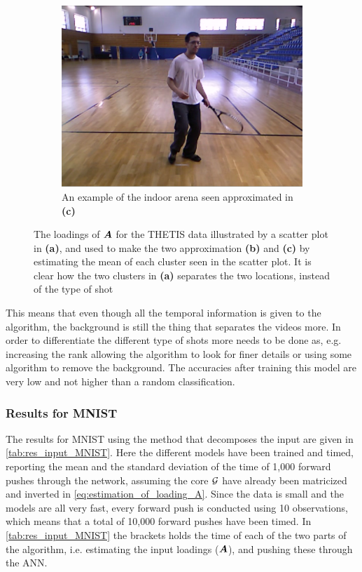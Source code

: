 \begin{figure}
\begin{subfigure}{.4\linewidth}
        \centering
        \captionsetup{width=.95\linewidth}
        \includegraphics[width=.78\linewidth]{Pics/06_results/loc_2_real.png}
        \caption{An example of the indoor arena seen approximated in \textbf{(c)}}
    \end{subfigure}
    \caption{The loadings of $\boldsymbol{A}$ for the THETIS data illustrated by a scatter plot in \textbf{(a)}, and used to make the two approximation \textbf{(b)} and \textbf{(c)} by estimating the mean of each cluster seen in the scatter plot. It is clear how the two clusters in \textbf{(a)} separates the two locations, instead of the type of shot}
    \label{fig:scatter_plot_THETIS}
\end{figure}
This means that even though all the temporal information is given to the algorithm, the background is still the thing that separates the videos more. In order to differentiate the different type of shots more needs to be done as, e.g. increasing the rank allowing the algorithm to look for finer details or using some algorithm to remove the background. The accuracies after training this model are very low and not higher than a random classification.

\subsubsection{Results for MNIST}
The results for MNIST using the method that decomposes the input are given in \autoref{tab:res_input_MNIST}. Here the different models have been trained and timed, reporting the mean and the standard deviation of the time of 1,000 forward pushes through the network, assuming the core $\mathcal{G}$ have already been matricized and inverted in \eqref{eq:estimation_of_loading_A}. Since the data is small and the models are all very fast, every forward push is conducted using 10 observations, which means that a total of 10,000 forward pushes have been timed. In \autoref{tab:res_input_MNIST}
the brackets holds the time of each of the two parts of the algorithm, i.e. estimating the input loadings ($\boldsymbol{A}$), and pushing these through the ANN. 

